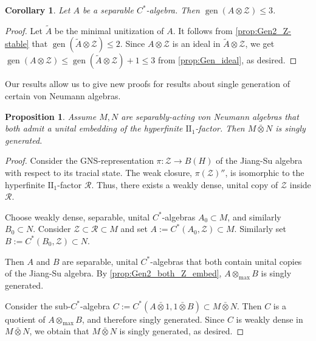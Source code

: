 \documentclass{amsart}
\newtheorem{cor}[corCt]{Corollary}
\newtheorem{prop}[propCt]{Proposition}
\theoremstyle{definition}
\begin{document}
\begin{cor}
\label{prop:Gen3_non-unital_Z-stable}
    Let $A$ be a separable {{$C^*$-al\-ge\-bra}}{}.
    Then $\operatorname{gen}(A\otimes \mathcal{Z})\leq 3$.
\end{cor}
\begin{proof}
    Let $\widetilde{A}$ be the minimal unitization of $A$.
    It follows from \autoref{prop:Gen2_Z-stable} that $\operatorname{gen}(\widetilde{A}\otimes\mathcal{Z})\leq 2$.
    Since $A\otimes\mathcal{Z}$ is an ideal in $\widetilde{A}\otimes\mathcal{Z}$, we get $\operatorname{gen}(A\otimes\mathcal{Z})\leq\operatorname{gen}(\widetilde{A}\otimes\mathcal{Z})+1\leq 3$ from \autoref{prop:Gen_ideal}, as desired.
\end{proof}

\noindent
    Our results allow us to give new proofs for results about single generation of certain  von Neumann algebras.

\begin{prop}
\label{prop:tensor_vNalg}
    Assume $M,N$ are separably-acting von Neumann algebras that both admit a unital embedding of the hyperfinite $\text{II}_1$-factor.
    Then $M\bar{\otimes}N$ is singly generated.
\end{prop}
\begin{proof}
    Consider the GNS-representation $\pi\colon\mathcal{Z}\to B(H)$ of the Jiang-Su algebra with respect to its tracial state.
    The weak closure, $\pi(\mathcal{Z})''$, is isomorphic to the hyperfinite $\text{II}_1$-factor $\mathcal{R}$.
    Thus, there exists a weakly dense, unital copy of $\mathcal{Z}$ inside $\mathcal{R}$.

    Choose  weakly dense, separable, unital {{$C^*$-al\-ge\-bra}}{s} $A_0\subset M$, and similarly $B_0\subset N$.
    Consider $\mathcal{Z}\subset\mathcal{R}\subset M$ and set $A:=C^*(A_0,\mathcal{Z})\subset M$.
    Similarly set $B:=C^*(B_0,\mathcal{Z})\subset N$.

    Then $A$ and $B$ are separable, unital {{$C^*$-al\-ge\-bra}}{s} that both contain unital copies of the Jiang-Su algebra.
    By \autoref{prop:Gen2_both_Z_embed}, $A\otimes_{\text{max}} B$ is singly generated.

    Consider the sub-{{$C^*$-al\-ge\-bra}}{} $C:=C^*(A\bar{\otimes}1,1\bar{\otimes}B)\subset M\bar{\otimes}N$.
    Then $C$ is a quotient of $A\otimes_{\text{max}} B$, and therefore singly generated.
    Since $C$ is weakly dense in $M\bar{\otimes}N$, we obtain that $M\bar{\otimes}N$ is singly generated, as desired.
\end{proof}
\end{document}
